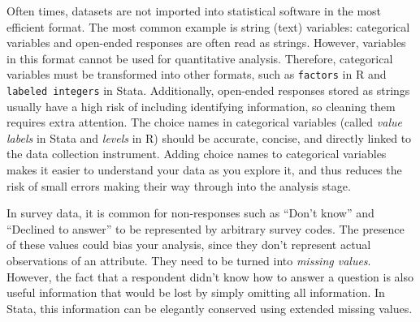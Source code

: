 Often times, datasets are not imported into statistical software in the most efficient format.
The most common example is string (text) variables:
categorical variables and open-ended responses are often read as strings.
However, variables in this format cannot be used for quantitative analysis.
Therefore, categorical variables must be transformed into other formats,
such as \texttt{factors} in R and \texttt{labeled integers} in Stata.
Additionally, open-ended responses stored as strings usually have a high risk of including identifying information,
so cleaning them requires extra attention.
The choice names in categorical variables
(called \textit{value labels} in Stata and \textit{levels} in R)
should be accurate, concise,
and directly linked to the data collection instrument.
Adding choice names to categorical variables
makes it easier to understand your data as you explore it,
and thus reduces the risk of small errors making their way through into the analysis stage.

In survey data, it is common for non-responses such as ``Don't know'' and ``Declined to answer''
to be represented by arbitrary survey codes.
The presence of these values could bias your analysis,
since they don't represent actual observations of an attribute.
They need to be turned into \textit{missing values}.
However, the fact that a respondent didn't know how to answer a question is also useful information
that would be lost by simply omitting all information.
In Stata, this information can be elegantly conserved using extended missing values.

